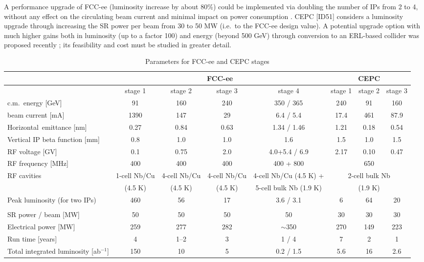 A performance upgrade of FCC-ee (luminosity increase by about 80\%) could be implemented via doubling the number of IPs from 2 to 4, without any effect on the circulating beam current and minimal impact on power consumption 
\cite{shatilov-2019,oide-2019,zimmermann-pol}. 
CEPC [ID51] considers a luminosity upgrade through increasing the SR power per beam from 30 to 50 MW (i.e.\ to the FCC-ee design value). A potential upgrade option with much higher gains both in luminosity (up to a factor 100) and energy (beyond 500 GeV) through conversion to an ERL-based collider was proposed recently \cite{bnl-erl}; its feasibility and cost must be studied in greater detail. 


\begin{landscape}
\begin{table}[htbp]
\caption{Parameters for FCC-ee and CEPC stages}
\label{tab:fcc-cepc}
\begin{center}
\begin{tabular}{l|cccc|ccc}
\hline\hline
 & \multicolumn{4}{c|}{FCC-ee} &
 \multicolumn{3}{c}{CEPC} \\
 \hline
 & stage 1 & stage 2 & stage 3 & stage 4 & stage 1 & stage 2 & stage 3 \\
 \hline
 c.m.~energy [GeV] & 91 & 160 & 240 & 350 / 365 &
 240 & 91 & 160 \\
 beam current [mA] & 1390 & 147 & 29 & 6.4 / 5.4
 &  17.4 & 461	& 87.9 \\ 
 Horizontal~emittance [nm]& 0.27 & 0.84 & 0.63& 1.34 /  1.46 & 1.21 & 0.18 & 0.54 \\
Vertical IP beta function [mm]
& 0.8 & 1.0 & 1.0 & 1.6 & 1.5& 1.0& 1.5\\
RF voltage [GV]	& 0.1 & 0.75 & 2.0 & 4.0+5.4 / 6.9 &  2.17 & 0.10& 0.47 \\
RF frequency [MHz]& 400	& 400 & 400 &  400 + 800 & 	\multicolumn{3}{c}{650} \\ 
RF cavities	& 1-cell Nb/Cu
& 	4-cell Nb/Cu
	& 4-cell Nb/Cu 	& 4-cell Nb/Cu (4.5 K) + 	& 
\multicolumn{3}{c}{2-cell bulk Nb}\\
& 
(4.5 K)& 	
(4.5 K)	&  (4.5 K)	& 5-cell bulk Nb (1.9 K)	& 
\multicolumn{3}{c}{(1.9 K)}\\
Peak luminosity (for two IPs) & 460 & 56& 17& 3.6 / 3.1
& 6 & 64 & 20 \\
\; \;  [$10^{34}$~ cm$^{-2}$s$^{-1}$] & & & & & & & \\
SR power / beam [MW] & 50 & 50 & 50 & 50 & 30 & 30 & 30 \\
Electrical power [MW] &  259 & 277 &
282 &	$\sim$350 & 270 & 149 & 223 \\
Run time [years] &  4 & 1--2 & 3 &1 / 4 &	
7 & 2 & 1 \\
Total integrated luminosity [ab$^{-1}$]	
& 150 & 10 & 5& 0.2 / 1.5 & 5.6 & 16 & 2.6\\
\hline\hline
\end{tabular}
\end{center}
\end{table}
\end{landscape}


